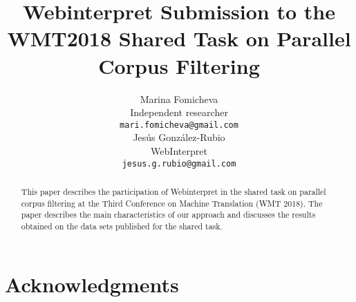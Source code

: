 \documentclass[11pt,a4paper]{article}
\title{Webinterpret Submission to the\\WMT2018 Shared Task on Parallel Corpus Filtering}
\author{Marina Fomicheva \\
  Independent researcher \\
  {\tt mari.fomicheva@gmail.com} \\\And
  Jes\'us Gonz\'alez-Rubio \\
  WebInterpret\\
  {\tt jesus.g.rubio@gmail.com} \\}
\date{}
\begin{document}
\maketitle
\begin{abstract}
  This paper describes the participation of Webinterpret in the shared task on parallel corpus filtering at the Third Conference on Machine Translation (WMT 2018). The paper describes the main characteristics of our approach and discusses the results obtained on the data sets published for the shared task.
\end{abstract}








\section*{Acknowledgments}





\end{document}
